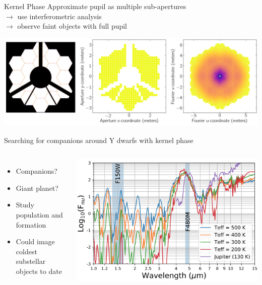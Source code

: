 \documentclass[10pt]{beamer}
\begin{document}

\begin{frame}{Kernel Phase}
  Approximate pupil as multiple sub-apertures\\ $\rightarrow$ use interferometric analysis\\ $\rightarrow$ observe faint objects with full pupil
  \begin{center}
    \includegraphics[width=\linewidth]{figures/kernel_model.png}
  \end{center}
\end{frame}

\begin{frame}{Searching for companions around Y dwarfs with kernel phase}


\begin{columns}
  \begin{itemize}
    \item Companions?
    \item Giant planet?
    \item Study population and formation
    \item Could image coldest substellar objects to date
  \end{itemize}
  \begin{center}
    \includegraphics[width=\linewidth]{figures/bd_spectra.png}
  \end{center}
\end{columns}
\end{frame}
\end{document}
